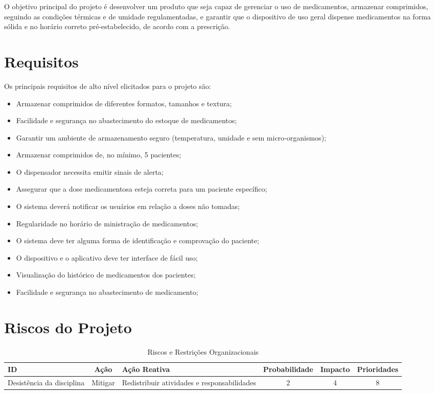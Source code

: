 \begin{apendicesenv}
O objetivo principal do projeto é desenvolver um produto que seja capaz de gerenciar o uso de medicamentos, armazenar comprimidos, seguindo as condições térmicas e de umidade regulamentadas, e garantir que o dispositivo de uso geral dispense medicamentos na forma sólida e no horário correto pré-estabelecido, de acordo com a prescrição. 


\section{Requisitos}
Os principais requisitos de alto nível elicitados para o projeto são:

\begin{itemize}
\item Armazenar comprimidos de diferentes formatos, tamanhos e textura;
\item Facilidade e segurança no abastecimento do estoque de medicamentos;
\item Garantir um ambiente de armazenamento seguro (temperatura, umidade e sem micro-organismos);
\item Armazenar comprimidos de, no mínimo, 5 pacientes;
\item O dispensador necessita emitir sinais de alerta;
\item Assegurar que a dose medicamentosa esteja correta para um paciente específico;
\item O sistema deverá notificar os usuários em relação a doses não tomadas;
\item Regularidade no horário de ministração de medicamentos;
\item O sistema deve ter alguma forma de identificação e comprovação do paciente;
\item O dispositivo e o aplicativo deve ter interface de fácil uso;
\item Visualização do histórico de medicamentos dos pacientes;
\item Facilidade e segurança no abastecimento de medicamento;
\end{itemize}

\section{Riscos do Projeto}

\begin{table}[H]
    \centering
    \caption{Riscos e Restrições Organizacionais}
    \label{tab:tap-riscos}
    \begin{adjustbox}{max width = \textwidth}
        \begin{tabular}{|L{5cm}|c|L{4cm}|c|c|c|}
            \hline
            \textbf{ID} & \textbf{Ação} & \textbf{Ação Reativa} & \textbf{Probabilidade} & \textbf{Impacto} & \textbf{Prioridades}\\ \hline
             Desistência da disciplina  & Mitigar & Redistribuir atividades e responsabilidades & 2 & 4 & 8 \\ \hline
        

\end{tabular}
\end{adjustbox}
\end{table}
\end{apendicesenv}
